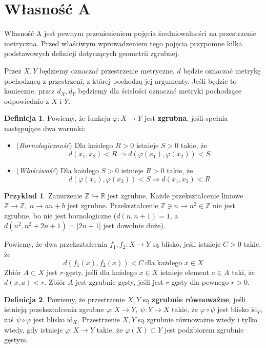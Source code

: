 \documentclass[licencjacka]{pracamgr}
\theoremstyle{definition}
\newtheorem{definition}{Definicja}[section]
\theoremstyle{definition}
\theoremstyle{definition}
\theoremstyle{definition}
\newtheorem{example}{Przykład}[section]
\theoremstyle{definition}
\theoremstyle{plain}
\theoremstyle{plain}
\begin{document}
\section{Własność A}

Własność A jest pewnym przeniesieniem pojęcia średniowalności na przestrzenie metryczna. 
Przed właściwym wprowadzeniem tego pojęcia przypomne kilka podstawowych 
definicji dotyczących geometrii zgrubnej.

Przez $ X,Y $ będziemy oznaczać przestrzenie metryczne, $ d $ będzie oznaczać metrykę 
pochodzącą z przestrzeni, z której pochodzą jej argumenty. Jeśli będzie to konieczne, 
przez $ d_X, d_Y $ będziemy dla ścisłości oznaczać metryki pochodzące odpowiednio z $ X $ 
i $ Y $.

\begin{definition}
	Powiemy, że funkcja $ \varphi: X \rightarrow Y $ jest \textbf{zgrubna}, jeśli 
	spełnia następujące dwa warunki:
	\begin{itemize}
	\item (\textit{Bornologiczność}) Dla każdego $ R > 0 $ istnieje $ S > 0 $ 
	takie, że 
	$$ d(x_1,x_2) < R \Rightarrow d \left( \varphi(x_1), \varphi(x_2)\right) < S $$
	\item (\textit{Właściwość}) Dla każdego $ S > 0 $ istnieje $ R > 0 $ takie, że 
	$$ d\left(\varphi(x_1), \varphi(x_2)\right) < S \Rightarrow d(x_1,x_2) < R $$
	\end{itemize}
\end{definition}

\begin{example}
	Zanurzenie $ \mathbb{Z} \hookrightarrow \mathbb{R} $ jest zgrubne. Każde 
	przekształcenie liniowe $ \mathbb{Z} \rightarrow \mathbb{Z}, ~ n \rightarrow
	an + b$ jest zgrubne. Przekształcenie $ \mathbb{Z} \ni n \rightarrow n^2 \in 
	\mathbb{Z} $ nie jest zgrubne, bo nie jest bornologiczne ($ d(n, n+1) = 1 $, a 
	$ d(n^2, n^2 + 2n + 1) = |2n+1| $ jest dowolnie duże).
\end{example}

Powiemy, że dwa przekształcenia $ f_1, f_2 : X \rightarrow Y $ są blisko, 
jeśli istnieje $ C > 0 $ takie, że $$ d(f_1(x), f_2(x)) < C  ~ \text{dla każdego } x \in X$$ 
Zbiór $ A \subset X $ jest $ r $-gęsty, jeśli dla każdego $ x \in X $ istnieje 
element $ a \in A $ taki, że $ d(x,a) < r $. Zbiór $ A $ jest zgrubnie gęsty, jeśli 
jest $ r $-gęsty dla pewnego $ r > 0 $.

\begin{definition}
	Powiemy, że przestrzenie $ X,Y $ są \textbf{zgrubnie równoważne}, jeśli 
	istnieją przekształcenia zgrubne $ \varphi : X \rightarrow Y, 
	~ \psi : Y \rightarrow X  $ takie, że 
	$ \varphi \circ \psi $ jest blisko $ \text{id}_Y $, zaś $ \psi \circ \varphi $ jest blisko 
	$ \text{id}_X $. Przestrzenie $ X,Y $ są zgrubnie równoważne wtedy i tylko wtedy, gdy 
	istnieje $ \varphi : X \rightarrow Y $ takie, że $ \varphi(X) \subset Y $ jest 
	podzbiorem zgrubnie gęstym.
\end{definition}
\end{document}
